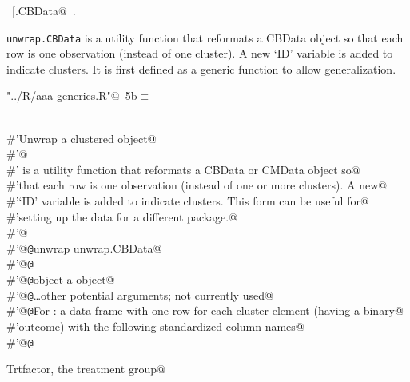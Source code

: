 \documentclass[reqno]{amsart}
\renewcommand{\NWtarget}[2]{\hypertarget{#1}{#2}}
\begin{document}
\begin{flushleft}
\begin{minipage}{\linewidth}
\begin{list}{}{\setlength{\itemsep}{-\parsep}\setlength{\itemindent}{-\leftmargin}}
\item \NWtxtIdentsDefed\nobreak\  \verb@[.CBData@\nobreak\ \NWtxtIdentsNotUsed.
\item{}
\end{list}
\end{minipage}\vspace{4ex}
\end{flushleft}
\texttt{unwrap.CBData} is a utility function that reformats a CBData object so that
each row is one observation (instead of one cluster). A new `ID' variable is added
to indicate clusters. It is first defined as a generic function to allow generalization.

\begin{flushleft} \small\label{scrap8}\raggedright\small
\NWtarget{nuweb5b}{} \verb@"../R/aaa-generics.R"@\nobreak\ {\footnotesize {5b}}$\equiv$
\vspace{-1ex}
\begin{list}{}{} \item
\mbox{}\verb@@\\
\mbox{}\verb@#'Unwrap a clustered object@\\
\mbox{}\verb@#'@\\
\mbox{}\verb@#' is a utility function that reformats a CBData or CMData object so@\\
\mbox{}\verb@#'that each row is one observation (instead of one or more clusters). A new@\\
\mbox{}\verb@#'`ID' variable is added to indicate clusters. This form can be useful for@\\
\mbox{}\verb@#'setting up the data for a different package.@\\
\mbox{}\verb@#'@\\
\mbox{}\verb@#'@{\tt @}\verb@aliases unwrap unwrap.CBData@\\
\mbox{}\verb@#'@{\tt @}\verb@export@\\
\mbox{}\verb@#'@{\tt @}\verb@param object a  object@\\
\mbox{}\verb@#'@{\tt @}\verb@param \dots other potential arguments; not currently used@\\
\mbox{}\verb@#'@{\tt @}\verb@return For : a data frame with one row for each cluster element (having a binary@\\
\mbox{}\verb@#'outcome) with the following standardized column names@\\
\mbox{}\verb@#'@{\tt @}\verb@return \item{Trt}{factor, the treatment group}@\\

\end{list}
\end{flushleft}
\end{document}

